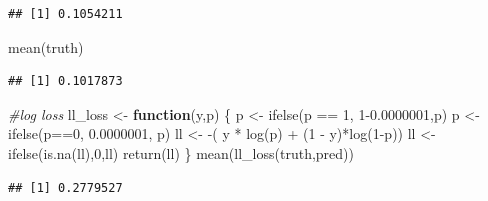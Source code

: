 \documentclass[
]{article}
\newenvironment{Shaded}{\begin{snugshade}}{\end{snugshade}}
\newcommand{\AttributeTok}[1]{\textcolor[rgb]{0.77,0.63,0.00}{#1}}
\newcommand{\CommentTok}[1]{\textcolor[rgb]{0.56,0.35,0.01}{\textit{#1}}}
\newcommand{\ControlFlowTok}[1]{\textcolor[rgb]{0.13,0.29,0.53}{\textbf{#1}}}
\newcommand{\DecValTok}[1]{\textcolor[rgb]{0.00,0.00,0.81}{#1}}
\newcommand{\FloatTok}[1]{\textcolor[rgb]{0.00,0.00,0.81}{#1}}
\newcommand{\FunctionTok}[1]{\textcolor[rgb]{0.00,0.00,0.00}{#1}}
\newcommand{\NormalTok}[1]{#1}
\newcommand{\OtherTok}[1]{\textcolor[rgb]{0.56,0.35,0.01}{#1}}
\newcommand{\SpecialCharTok}[1]{\textcolor[rgb]{0.00,0.00,0.00}{#1}}
\begin{document}
\begin{Shaded}
\end{Shaded}

\begin{verbatim}
## [1] 0.1054211
\end{verbatim}

\begin{Shaded}
\begin{Highlighting}[]
\FunctionTok{mean}\NormalTok{(truth)}
\end{Highlighting}
\end{Shaded}

\begin{verbatim}
## [1] 0.1017873
\end{verbatim}

\begin{Shaded}
\begin{Highlighting}[]
\CommentTok{\#log loss}
\NormalTok{ll\_loss }\OtherTok{\textless{}{-}} \ControlFlowTok{function}\NormalTok{(y,p) \{}
\NormalTok{  p }\OtherTok{\textless{}{-}} \FunctionTok{ifelse}\NormalTok{(p }\SpecialCharTok{==} \DecValTok{1}\NormalTok{, }\DecValTok{1}\FloatTok{{-}0.0000001}\NormalTok{,p)}
\NormalTok{  p }\OtherTok{\textless{}{-}} \FunctionTok{ifelse}\NormalTok{(p}\SpecialCharTok{==}\DecValTok{0}\NormalTok{, }\FloatTok{0.0000001}\NormalTok{, p)}
\NormalTok{  ll }\OtherTok{\textless{}{-}} \SpecialCharTok{{-}}\NormalTok{( y }\SpecialCharTok{*} \FunctionTok{log}\NormalTok{(p) }\SpecialCharTok{+}\NormalTok{ (}\DecValTok{1} \SpecialCharTok{{-}}\NormalTok{ y)}\SpecialCharTok{*}\FunctionTok{log}\NormalTok{(}\DecValTok{1}\SpecialCharTok{{-}}\NormalTok{p))}
\NormalTok{  ll }\OtherTok{\textless{}{-}} \FunctionTok{ifelse}\NormalTok{(}\FunctionTok{is.na}\NormalTok{(ll),}\DecValTok{0}\NormalTok{,ll)}
  \FunctionTok{return}\NormalTok{(ll)}
\NormalTok{\}}
\FunctionTok{mean}\NormalTok{(}\FunctionTok{ll\_loss}\NormalTok{(truth,pred))}
\end{Highlighting}
\end{Shaded}

\begin{verbatim}
## [1] 0.2779527
\end{verbatim}
\end{document}
